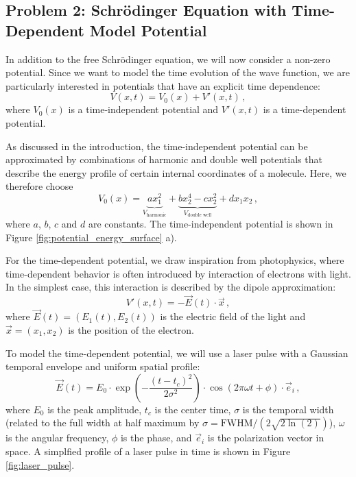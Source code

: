 \documentclass{article}
\theoremstyle{definition}
\theoremstyle{plain}
\theoremstyle{remark}
\begin{document}
\subsection*{Problem 2: Schrödinger Equation with Time-Dependent Model Potential}

In addition to the free Schrödinger equation, we will now consider a non-zero potential. Since we want to model the time evolution of the wave function, we are particularly interested in potentials that have an explicit time dependence:
\[
  V(x,t) = V_0 (x) + V'(x,t) \,,
\]
where $V_0 (x)$ is a time-independent potential and $V'(x,t)$ is a time-dependent potential.

As discussed in the introduction, the time-independent potential can be approximated by combinations of harmonic and double well potentials that describe the energy profile of certain internal coordinates of a molecule. Here, we therefore choose
\[
  V_0 (x) = \underbrace{a x_1^2}_{V_\text{harmonic}} + \underbrace{b x_2^4 - c x_2^2}_{V_\text{double well}} + d x_1 x_2 \,,
\]
where $a$, $b$, $c$ and $d$ are constants. The time-independent potential is shown in Figure \ref{fig:potential_energy_surface} a).

For the time-dependent potential, we draw inspiration from photophysics, where time-dependent behavior is often introduced by interaction of electrons with light. In the simplest case, this interaction is described by the dipole approximation:
\[
  V'(x,t) = - \vec{E}(t) \cdot \vec{x} \,,
\]
where $\vec{E}(t) = (E_1(t), E_2(t))$ is the electric field of the light and $\vec{x} = (x_1, x_2)$ is the position of the electron.

To model the time-dependent potential, we will use a laser pulse with a Gaussian temporal envelope and uniform spatial profile:
\[
\vec{E}(t) = E_0 \cdot \exp\left(-\frac{(t - t_c)^2}{2\sigma^2}\right) \cdot \cos(2\pi\omega t + \phi) \cdot \vec{e}_i \,,
\]
where $E_0$ is the peak amplitude, $t_c$ is the center time, $\sigma$ is the temporal width (related to the full width at half maximum by $\sigma = \text{FWHM}/(2\sqrt{2\ln(2)})$), $\omega$ is the angular frequency, $\phi$ is the phase, and $\vec{e}_i$ is the polarization vector in space. A simplfied profile of a laser pulse in time is shown in Figure \ref{fig:laser_pulse}.
\end{document}
